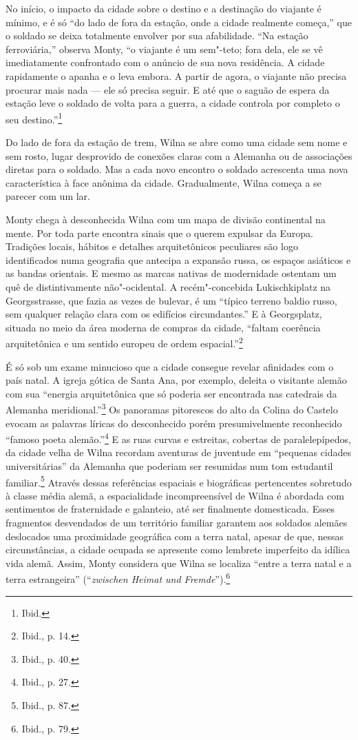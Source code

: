 No início, o impacto da cidade sobre o destino e a destinação do
viajante é mínimo, e é só ``do lado de fora da estação, onde a cidade
realmente começa,'' que o soldado se deixa totalmente envolver por sua
afabilidade. ``Na estação ferroviária,'' observa Monty, ``o viajante é
um sem"-teto; fora dela, ele se vê imediatamente confrontado com o
anúncio de sua nova residência. A cidade rapidamente o apanha e o leva
embora. A partir de agora, o viajante não precisa procurar mais nada ---
ele só precisa seguir. E até que o saguão de espera da estação leve o
soldado de volta para a guerra, a cidade controla por completo o seu
destino.''\footnote{Ibid.}

Do lado de fora da estação de trem, Wilna se abre como uma cidade sem
nome e sem rosto, lugar desprovido de conexões claras com a Alemanha ou
de associações diretas para o soldado. Mas a cada novo encontro o
soldado acrescenta uma nova característica à face anônima da cidade.
Gradualmente, Wilna começa a se parecer com um lar.

Monty chega à desconhecida Wilna com um mapa de divisão continental na
mente. Por toda parte encontra sinais que o querem expulsar da Europa.
Tradições locais, hábitos e detalhes arquitetônicos peculiares são logo
identificados numa geografia que antecipa a expansão russa, os espaços
asiáticos e as bandas orientais. E mesmo as marcas nativas de
modernidade ostentam um quê de distintivamente não"-ocidental. A
recém"-concebida Lukischkiplatz na Georgsstrasse, que fazia as vezes de
bulevar, é um ``típico terreno baldio russo, sem qualquer relação clara
com os edifícios circundantes.'' E à Georgsplatz, situada no meio da
área moderna de compras da cidade, ``faltam coerência arquitetônica e um
sentido europeu de ordem espacial.''\footnote{Ibid., p. 14.}

É só sob um exame minucioso que a cidade consegue revelar afinidades com
o país natal. A igreja gótica de Santa Ana, por exemplo, deleita o
visitante alemão com sua ``energia arquitetônica que só poderia ser
encontrada nas catedrais da Alemanha meridional.''\footnote{Ibid., p.
  40.} Os panoramas pitorescos do alto da Colina do Castelo evocam as
palavras líricas do desconhecido porém presumivelmente reconhecido
``famoso poeta alemão.''\footnote{Ibid., p. 27.} E as ruas curvas e
estreitas, cobertas de paralelepípedos, da cidade velha de Wilna
recordam aventuras de juventude em ``pequenas cidades universitárias''
da Alemanha que poderiam ser resumidas num tom estudantil
familiar.\footnote{Ibid., p. 87.} Através dessas referências espaciais e
biográficas pertencentes sobretudo à classe média alemã, a espacialidade
incompreensível de Wilna é abordada com sentimentos de fraternidade e
galanteio, até ser finalmente domesticada. Esses fragmentos desvendados
de um território familiar garantem aos soldados alemães deslocados uma
proximidade geográfica com a terra natal, apesar de que, nessas
circunstâncias, a cidade ocupada se apresente como lembrete imperfeito
da idílica vida alemã. Assim, Monty considera que Wilna se localiza
``entre a terra natal e a terra estrangeira'' (``\emph{zwischen Heimat
und Fremde}'').\footnote{Ibid., p. 79.}

